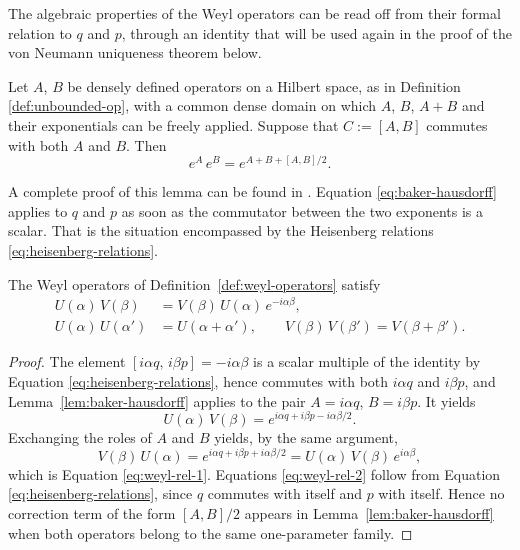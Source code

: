	\noindent The algebraic properties of the Weyl operators can be read off from their formal relation to $q$ and $p$, through an identity that will be used again in the proof of the von Neumann uniqueness theorem below.
	
	\begin{lemma}
		\label{lem:baker-hausdorff}
		Let $A$, $B$ be densely defined operators on a Hilbert space, as in Definition \ref{def:unbounded-op}, with a common dense domain on which $A$, $B$, $A+B$ and their exponentials can be freely applied. Suppose that $C := [A,B]$ commutes with both $A$ and $B$. Then
		\begin{equation}
			e^A\,e^B = e^{A+B+[A,B]/2}.
			\label{eq:baker-hausdorff}
		\end{equation}
	\end{lemma}
	
	\noindent A complete proof of this lemma can be found in \cite[p.61]{strocchiIntroductionMathematicalStructure2005}. Equation \eqref{eq:baker-hausdorff} applies to $q$ and $p$ as soon as the commutator between the two exponents is a scalar. That is the situation encompassed by the Heisenberg relations \eqref{eq:heisenberg-relations}.
	
	\begin{proposition}
		\label{prop:weyl-relations}
		The Weyl operators of Definition~\ref{def:weyl-operators} satisfy
		\begin{align}
			U(\alpha)\,V(\beta) &= V(\beta)\,U(\alpha)\,e^{-i\alpha\beta}, \label{eq:weyl-rel-1}\\
			U(\alpha)\,U(\alpha') &= U(\alpha+\alpha'), \qquad V(\beta)\,V(\beta') = V(\beta+\beta'). \label{eq:weyl-rel-2}
		\end{align}
	\end{proposition}
	
	\begin{proof}
		The element $[i\alpha q,\, i\beta p] = -i\alpha\beta$ is a scalar multiple of the identity by Equation \eqref{eq:heisenberg-relations}, hence commutes with both $i\alpha q$ and $i\beta p$, and Lemma~\ref{lem:baker-hausdorff} applies to the pair $A=i\alpha q$, $B=i\beta p$. It yields
		\begin{equation}
			U(\alpha)\,V(\beta) = e^{i\alpha q + i\beta p - i\alpha\beta/2}.
		\end{equation}
		Exchanging the roles of $A$ and $B$ yields, by the same argument,
		\begin{equation}
			V(\beta)\,U(\alpha) = e^{i\alpha q + i\beta p + i\alpha\beta/2} = U(\alpha)\,V(\beta)\,e^{i\alpha\beta},
		\end{equation}
		which is Equation \eqref{eq:weyl-rel-1}. Equations \eqref{eq:weyl-rel-2} follow from Equation \eqref{eq:heisenberg-relations}, since $q$ commutes with itself and $p$ with itself. Hence no correction term of the form $[A,B]/2$ appears in Lemma~\ref{lem:baker-hausdorff} when both operators belong to the same one-parameter family.
	\end{proof}
	
